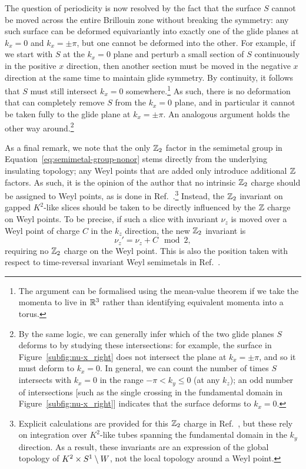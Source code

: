 The question of periodicity is now resolved by the fact that the surface $S$ cannot be moved across the entire Brillouin zone without breaking the symmetry: any such surface can be deformed equivariantly into exactly one of the glide planes at $k_x=0$ and $k_x=\pm\pi$, but one cannot be deformed into the other. For example, if we start with $S$ at the $k_x=0$ plane and perturb a small section of $S$ continuously in the positive $x$ direction, then another section must be moved in the negative $x$ direction at the same time to maintain glide symmetry. By continuity, it follows that $S$ must still intersect $k_x=0$ somewhere.\footnote{
	The argument can be formalised using the mean-value theorem if we take the momenta to live in $\mathbb{R}^3$ rather than identifying equivalent momenta into a torus.}
As such, there is no deformation that can completely remove $S$ from the $k_x=0$ plane, and in particular it cannot be taken fully to the glide plane at $k_x=\pm\pi$. An analogous argument holds the other way around.\footnote{
	By the same logic, we can generally infer which of the two glide planes $S$ deforms to by studying these intersections: for example, the surface in Figure~\ref{subfig:nu-x_right} does not intersect the plane at $k_x=\pm\pi$, and so it must deform to $k_x=0$. In general, we can count the number of times $S$ intersects with $k_x=0$ in the range $-\pi<k_y\leq 0$ (at any $k_z$); an odd number of intersections [such as the single crossing in the fundamental domain in Figure~\ref{subfig:nu-x_right}] indicates that the surface deforms to $k_x=0$.}

As a final remark, we note that the only $\mathbb{Z}_2$ factor in the semimetal group in Equation~\eqref{eq:semimetal-group-nonor} stems directly from the underlying insulating topology; any Weyl points that are added only introduce additional $\mathbb{Z}$ factors. As such, it is the opinion of the author that no intrinsic $\mathbb{Z}_2$ charge should be assigned to Weyl points, as is done in Ref.~\cite{Fonseca-Vaidya_nonorientable}.\footnote{
	Explicit calculations are provided for this $\mathbb{Z}_2$ charge in Ref.~\cite{Fonseca-Vaidya_nonorientable}, but these rely on integration over $K^2$-like tubes spanning the fundamental domain in the $k_y$ direction. As a result, these invariants are an expression of the global topology of $K^2\times S^1\setminus W$, not the local topology around a Weyl point.}
Instead, the $\mathbb{Z}_2$ invariant on gapped $K^2$-like slices should be taken to be directly influenced by the $\mathbb{Z}$ charge on Weyl points. To be precise, if such a slice with invariant $\nu_z$ is moved over a Weyl point of charge $C$ in the $k_z$ direction, the new $\mathbb{Z}_2$ invariant is
\begin{equation*}
	\nu_z' = \nu_z + C \mod 2,
\end{equation*}
requiring no $\mathbb{Z}_2$ charge on the Weyl point. This is also the position taken with respect to time-reversal invariant Weyl semimetals in Ref.~\cite{Thiang_equivariant}.


